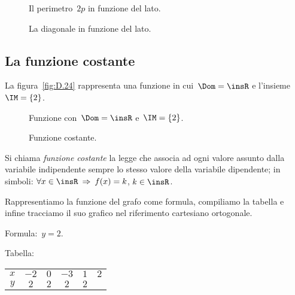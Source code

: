 \begin{figure}[hb]
 \begin{minipage}[b]{.45\textwidth}
  \centering
  \caption{Il perimetro~$2p$ in funzione del lato.}\label{fig:D.22}
 \end{minipage}\hfil
 \begin{minipage}[b]{.45\textwidth}
  \centering
  \caption{La diagonale in funzione del lato.}\label{fig:D.23}
 \end{minipage}
\end{figure}

\vspazio\ovalbox{\risolvii \ref{ese:D.39}, \ref{ese:D.40}, \ref{ese:D.41}, \ref{ese:D.42}, \ref{ese:D.43}}

\subsection{La funzione costante}

La figura~\ref{fig:D.24} rappresenta una funzione in cui~$\Dom=\insR$ e l'insieme~$\IM=\{2\}$.

\begin{figure}[ht]
 \begin{minipage}[b]{.50\textwidth}
  \centering
  \caption{Funzione con~$\Dom=\insR$ e~$\IM=\{2\}$.}\label{fig:D.24}
 \end{minipage}\hfil
 \begin{minipage}[b]{.4\textwidth}
  \centering
  \caption{Funzione costante.}\label{fig:D.25}
 \end{minipage}
\end{figure}

\begin{definizione}
Si chiama \emph{funzione costante} la legge che associa ad ogni valore assunto dalla variabile indipendente sempre lo stesso valore
della variabile dipendente; in simboli: $\forall x\in \insR \:\Rightarrow\: f(x)=k$, $k\in \insR$.
\end{definizione}

Rappresentiamo la funzione del grafo come formula, compiliamo la tabella e infine tracciamo il suo grafico
nel riferimento cartesiano ortogonale.

Formula:~$y=2$.

Tabella:
\begin{center}
 \begin{tabular}{cccccc}
 \toprule
 $x$ & $-2$ & $0$ & $-3$ & $1$ & $2$ \\
 $y$ & $2$ & $2$ & $2$ & $2$ &  \\
 \bottomrule
 \end{tabular}
\end{center}

